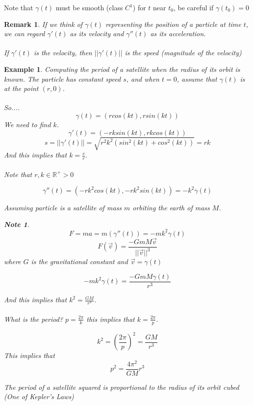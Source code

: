 \documentclass[12pt]{article}
\theoremstyle{plain}
\newtheorem*{remark}{Remark}
\newtheorem*{note}{Note}
\newtheorem{example}[theorem]{Example}
\theoremstyle{definition}
\begin{document}
Note that $\gamma (t)$ must be smooth (class $C^1$) for $t$ near $t_0$, be careful if $\gamma (t_0) = 0$

\begin{remark}
	If we think of $\gamma (t)$ representing the position of a particle at time $t$, we can regard $\gamma ' (t)$ as its velocity and $\gamma '' (t)$ as its acceleration.\\
	\\
	If $\gamma ' (t)$ is the velocity, then $||\gamma ' (t)||$ is the speed (magnitude of the velocity)
\end{remark}

\begin{example}
	Computing the period of a satellite when the radius of its orbit is known. The particle has constant speed $s$, and when $t=0$, assume that $\gamma (t)$ is at the point $(r,0)$.\\
	\\
	So....
	$$\gamma(t) = (rcos(kt), rsin(kt))$$
	We need to find $k$.
	$$\gamma ' (t) = (-rksin(kt), rkcos(kt))$$
	$$s = ||\gamma ' (t)|| = \sqrt{r^2 k^2 (sin^2 (kt) + cos^2 (kt))} = rk$$
	And this implies that $k = \frac{s}{r}$.\\
	\\
	Note that $r,k \in \mathbb{R}^+ > 0$

	$$\gamma '' (t) = (-rk^2 cos(kt), -rk^2 sin(kt)) = -k^2 \gamma (t)$$

	Assuming particle is a satellite of mass $m$ orbiting the earth of mass $M$.

	\begin{note}
		$$F = ma = m(\gamma '' (t)) = -mk^2 \gamma (t)$$
		$$F(\vec{v}) = \frac{-G m M \vec{v}}{||\vec{v}||^3}$$
		where $G$ is the gravitational constant and $\vec{v} = \gamma (t)$
	\end{note}

	$$-mk^2 \gamma (t) = \frac{-G m M \gamma (t)}{r^3}$$

	And this implies that $k^2 = \frac{GM}{r^3}$.\\
	\\
	What is the period? $p = \frac{2\pi}{k}$ this implies that $k = \frac{2\pi}{p}$.

	$$k^2 = (\frac{2\pi}{p})^2 = \frac{GM}{r^3}$$
	This implies that
	$$p^2 = \frac{4 \pi^2}{GM} r^3$$

	The period of a satellite squared is proportional to the radius of its orbit cubed (One of Kepler's Laws)

\end{example}
\end{document}
